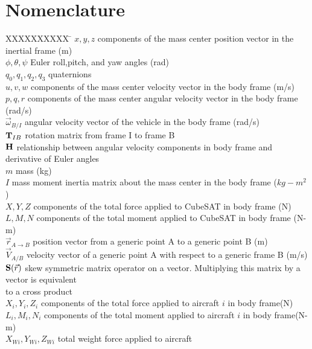 \section{Nomenclature}

\begin{tabbing}
  XXXXXXXXXX \= \kill%
  $x,y,z$ \> components of the mass center position vector in the
  inertial frame (m)  \\
  $\phi,\theta,\psi$ \> Euler roll,pitch, and yaw angles (rad) \\
  $q_0,q_1,q_2,q_3$ \>  quaternions \\  
  $u,v,w$ \> components of the mass center velocity vector in the
  body frame (m/s)  \\
  $p,q,r$ \> components of the mass center angular velocity vector in the
  body frame (rad/s)  \\
  $\vec{\omega}_{B/I}$ \> angular velocity vector of the vehicle in
  the body frame (rad/s) \\
  ${\bf T}_{IB}$ \> rotation matrix from frame I to frame B \\
  ${\bf H}$ \> relationship between angular velocity components in
  body frame and derivative of Euler angles \\
  $m$ \> mass (kg) \\
  $I$ \> mass moment inertia matrix about the mass center
  in the body frame ($kg-m^2$)  \\
  $X,Y,Z$ \> components of the total force applied to CubeSAT in
  body frame (N)  \\
  $L,M,N$ \> components of the total moment applied to CubeSAT in
  body frame (N-m)  \\
  ${\vec r}_{A\rightarrow B}$ \> position vector from a generic point A
  to a generic point B (m) \\
  ${\vec V}_{A/B}$ \> velocity vector of a generic point A
  with respect to a generic frame B (m/s) \\
  ${\bf S}(\vec{r})$ \> skew symmetric matrix operator on a
  vector. Multiplying this matrix by a vector is equivalent \\
  \> to a cross product\\
    $X_i,Y_i,Z_i$ \> components of the total force applied to aircraft $i$ in
  body frame(N) \\
  $L_i,M_i,N_i$ \> components of the total moment applied to aircraft
  $i$ in body frame(N-m) \\
  $X_{Wi},Y_{Wi},Z_{Wi}$ \> total weight force applied to aircraft

\end{tabbing}
